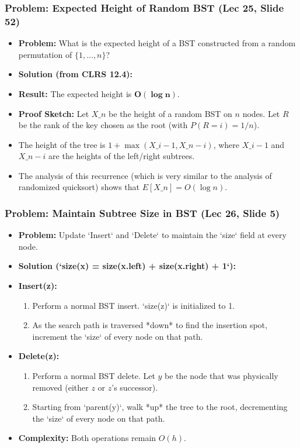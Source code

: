 \subsubsection{Problem: Expected Height of Random BST (Lec 25, Slide 52)}
\begin{itemize}
    \item \textbf{Problem:} What is the expected height of a BST constructed from a random permutation of $\{1, \dots, n\}$?
    \item \textbf{Solution (from CLRS 12.4):}
    \item \textbf{Result:} The expected height is $\mathbf{O(\log n)}$.
    \item \textbf{Proof Sketch:} Let $X\_n$ be the height of a random BST on $n$ nodes. Let $R$ be the rank of the key chosen as the root (with $P(R=i) = 1/n$).
    \item The height of the tree is $1 + \max(X\_{i-1}, X\_{n-i})$, where $X\_{i-1}$ and $X\_{n-i}$ are the heights of the left/right subtrees.
    \item The analysis of this recurrence (which is very similar to the analysis of randomized quicksort) shows that $E[X\_n] = O(\log n)$.
\end{itemize}

\subsubsection{Problem: Maintain Subtree Size in BST (Lec 26, Slide 5)}
\begin{itemize}
    \item \textbf{Problem:} Update `Insert` and `Delete` to maintain the `size` field at every node.
    \item \textbf{Solution (`size(x) = size(x.left) + size(x.right) + 1`):}
    \item \textbf{Insert(z):}
    \begin{enumerate}
        \item Perform a normal BST insert. `size(z)` is initialized to 1.
        \item As the search path is traversed *down* to find the insertion spot, increment the `size` of every node on that path.
    \end{enumerate}
    \item \textbf{Delete(z):}
    \begin{enumerate}
        \item Perform a normal BST delete. Let $y$ be the node that was physically removed (either $z$ or $z$'s successor).
        \item Starting from `parent(y)`, walk *up* the tree to the root, decrementing the `size` of every node on that path.
    \end{enumerate}
    \item \textbf{Complexity:} Both operations remain $O(h)$.
\end{itemize}

